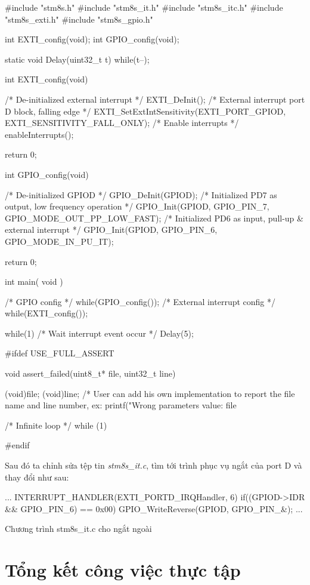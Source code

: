 \begin{ccode}
#include "stm8s.h"
#include "stm8s_it.h"
#include "stm8s_itc.h"
#include "stm8s_exti.h"
#include "stm8s_gpio.h"

int EXTI_config(void);
int GPIO_config(void);

static void Delay(uint32_t t)
{
 while(t--);
}

int EXTI_config(void) {
  /* De-initialized external interrupt */
  EXTI_DeInit();
  /* External interrupt port D block, falling edge */
  EXTI_SetExtIntSensitivity(EXTI_PORT_GPIOD, EXTI_SENSITIVITY_FALL_ONLY);
  /* Enable interrupts */
  enableInterrupts();

  return 0;
}

int GPIO_config(void) {
  /* De-initialized GPIOD */
  GPIO_DeInit(GPIOD);
  /* Initialized PD7 as output, low frequency operation */
  GPIO_Init(GPIOD, GPIO_PIN_7, GPIO_MODE_OUT_PP_LOW_FAST);
  /* Initialized PD6 as input, pull-up & external interrupt */
  GPIO_Init(GPIOD, GPIO_PIN_6, GPIO_MODE_IN_PU_IT);

  return 0;
}

int main( void )
{
  /* GPIO config */
  while(GPIO_config());
  /* External interrupt config */
  while(EXTI_config());

  while(1)
  {
  /* Wait interrupt event occur */
    Delay(5);
  }
}

#ifdef USE_FULL_ASSERT

void assert_failed(uint8_t* file, uint32_t line)
{
  (void)file;
  (void)line;
  /* User can add his own implementation to report the file name and line number,
  ex: printf("Wrong parameters value: file %

  /* Infinite loop */
  while (1)
  {
  }
}
#endif
\end{ccode}

\pagebreak
Sau đó ta chỉnh sửa tệp tin \emph{stm8s\_it.c}, tìm tới trình phục vụ ngắt của port D và thay đổi như sau:
\begin{listing}
\begin{ccode}
...
INTERRUPT_HANDLER(EXTI_PORTD_IRQHandler, 6)
{
  if((GPIOD->IDR && GPIO_PIN_6) == 0x00)
  {
    GPIO_WriteReverse(GPIOD, GPIO_PIN_&);
  }
}
...
\end{ccode}
\caption{Chương trình stm8s\_it.c cho ngắt ngoài}
\end{listing}

\chapter{Tổng kết công việc thực tập}
